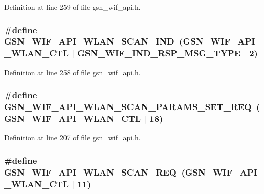 Definition at line 259 of file gsn\_\-wif\_\-api.h.

\hypertarget{a00606_aecb8f3f1b29bed47468e3462e98d7134}{
\subsubsection[{GSN\_\-WIF\_\-API\_\-WLAN\_\-SCAN\_\-IND}]{\setlength{\rightskip}{0pt plus 5cm}\#define GSN\_\-WIF\_\-API\_\-WLAN\_\-SCAN\_\-IND~(GSN\_\-WIF\_\-API\_\-WLAN\_\-CTL $|$ GSN\_\-WIF\_\-IND\_\-RSP\_\-MSG\_\-TYPE $|$ 2)}}
\label{a00606_aecb8f3f1b29bed47468e3462e98d7134}


Definition at line 258 of file gsn\_\-wif\_\-api.h.

\hypertarget{a00606_ae77e40031b89eb3bb5fdea3318597f19}{
\subsubsection[{GSN\_\-WIF\_\-API\_\-WLAN\_\-SCAN\_\-PARAMS\_\-SET\_\-REQ}]{\setlength{\rightskip}{0pt plus 5cm}\#define GSN\_\-WIF\_\-API\_\-WLAN\_\-SCAN\_\-PARAMS\_\-SET\_\-REQ~(GSN\_\-WIF\_\-API\_\-WLAN\_\-CTL $|$ 18)}}
\label{a00606_ae77e40031b89eb3bb5fdea3318597f19}


Definition at line 207 of file gsn\_\-wif\_\-api.h.

\hypertarget{a00606_a36d04dda650efd1945604cf4e91fc93a}{
\subsubsection[{GSN\_\-WIF\_\-API\_\-WLAN\_\-SCAN\_\-REQ}]{\setlength{\rightskip}{0pt plus 5cm}\#define GSN\_\-WIF\_\-API\_\-WLAN\_\-SCAN\_\-REQ~(GSN\_\-WIF\_\-API\_\-WLAN\_\-CTL $|$ 11)}}
\label{a00606_a36d04dda650efd1945604cf4e91fc93a}


